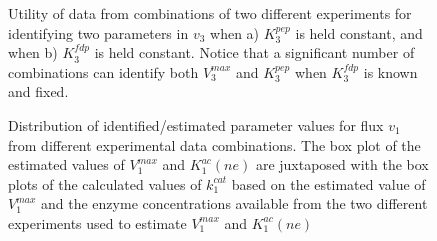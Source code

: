 \documentclass[10pt]{article}
\begin{document}
	\begin{figure}[!tbhp]
		\caption{Utility of data from combinations of two different experiments for identifying two parameters in $v_3$ when a) $K_3^{pep}$ is held constant, and when b) $K_3^{fdp}$ is held constant. Notice that a significant number of combinations can identify both $V_3^{max}$ and $K_3^{pep}$ when $K_3^{fdp}$ is known and fixed.}%
	\end{figure}		

	\begin{figure}[!tbhp]
		\caption{Distribution of identified/estimated parameter values for flux $v_1$ from different experimental data combinations. The box plot of the estimated values of $V_1^{max}$ and $K_1^{ac}(ne)$ are juxtaposed with the box plots of the calculated values of $k_1^{cat}$ based on the estimated value of $V_1^{max}$ and the enzyme concentrations available from the two different experiments used to estimate $V_1^{max}$ and $K_1^{ac}(ne)$}\label{fig:parameter_value_v1_v1max_kcat}
	\end{figure}	
	
\end{document}
